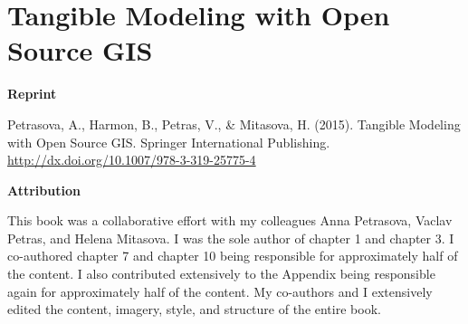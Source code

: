 \chapter{Tangible Modeling with Open Source GIS}
\label{chap-five}

\textbf{Reprint}

Petrasova, A., Harmon, B., Petras, V., \& Mitasova, H. (2015). Tangible Modeling with Open Source GIS. Springer International Publishing. \url{http://dx.doi.org/10.1007/978-3-319-25775-4}

\textbf{Attribution}

This book was a collaborative effort with my colleagues 
Anna Petrasova, Vaclav Petras, and Helena Mitasova.
I was the sole author of  chapter 1 and chapter 3. 
I co-authored chapter 7 and chapter 10 being responsible for approximately half of the content.
I also contributed extensively to the Appendix being responsible again for approximately half of the content.
My co-authors and I extensively edited the content, imagery, style, and structure of the entire book. 

\vfil
\pagebreak

%

%

